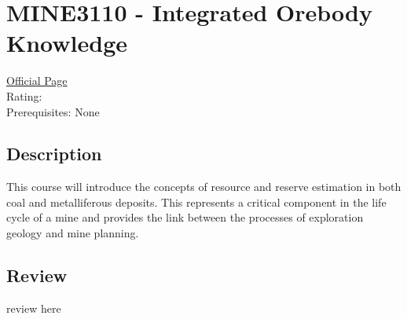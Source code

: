 \hypertarget{MINE3110}{\section{MINE3110 - Integrated Orebody Knowledge}}

\large
\textcolor{turbo_purple}{\href{https://my.uq.edu.au/programs-courses/course.html?course_code=MINE3110}{Official Page}} \\
Rating: \cstar\cstar\cstar\cstar\ostar \\
Prerequisites: None

\normalsize
\subsection*{Description}
This course will introduce the concepts of resource and reserve estimation in both coal and metalliferous deposits.
This represents a critical component in the life cycle of a mine and provides the link between the processes of exploration geology and mine planning.

\subsection*{Review}
review here
